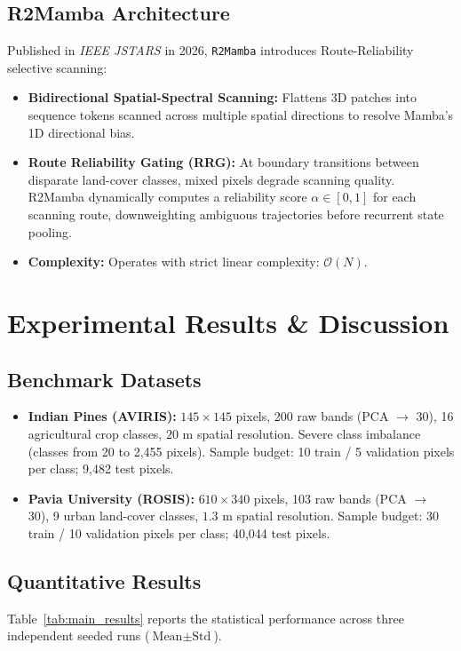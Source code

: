 \documentclass[conference]{IEEEtran}
\begin{document}
\subsection{R2Mamba Architecture}
Published in \textit{IEEE JSTARS} in 2026, \texttt{R2Mamba} \cite{r2mamba} introduces Route-Reliability selective scanning:
\begin{itemize}
    \item \textbf{Bidirectional Spatial-Spectral Scanning:} Flattens 3D patches into sequence tokens scanned across multiple spatial directions to resolve Mamba's 1D directional bias.
    \item \textbf{Route Reliability Gating (RRG):} At boundary transitions between disparate land-cover classes, mixed pixels degrade scanning quality. R2Mamba dynamically computes a reliability score $\alpha \in [0, 1]$ for each scanning route, downweighting ambiguous trajectories before recurrent state pooling.
    \item \textbf{Complexity:} Operates with strict linear complexity: $\mathcal{O}(N)$.
\end{itemize}

\section{Experimental Results \& Discussion}

\subsection{Benchmark Datasets}
\begin{itemize}
    \item \textbf{Indian Pines (AVIRIS):} $145 \times 145$ pixels, 200 raw bands (PCA $\rightarrow$ 30), 16 agricultural crop classes, $20\text{ m}$ spatial resolution. Severe class imbalance (classes from 20 to 2,455 pixels). Sample budget: 10 train / 5 validation pixels per class; 9,482 test pixels.
    \item \textbf{Pavia University (ROSIS):} $610 \times 340$ pixels, 103 raw bands (PCA $\rightarrow$ 30), 9 urban land-cover classes, $1.3\text{ m}$ spatial resolution. Sample budget: 30 train / 10 validation pixels per class; 40,044 test pixels.
\end{itemize}

\subsection{Quantitative Results}
Table~\ref{tab:main_results} reports the statistical performance across three independent seeded runs ($\text{Mean} \pm \text{Std}$).
\end{document}
